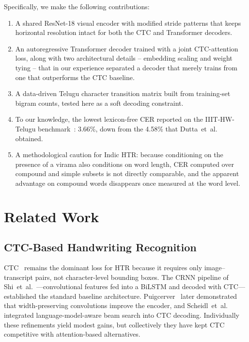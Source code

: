 \documentclass[conference]{IEEEtran}
\begin{document}
Specifically, we make the following contributions:

\begin{enumerate}
    \item A shared ResNet-18 visual encoder with modified stride patterns that keeps horizontal resolution intact for both the CTC and Transformer decoders.
    
    \item An autoregressive Transformer decoder trained with a joint CTC-attention loss, along with two architectural details -- embedding scaling and weight tying -- that in our experience separated a decoder that merely trains from one that outperforms the CTC baseline.
    
    \item A data-driven Telugu character transition matrix built from training-set bigram counts, tested here as a soft decoding constraint.
    
    \item To our knowledge, the lowest lexicon-free CER reported on the IIIT-HW-Telugu benchmark~\cite{gongidi2021iiit}: 3.66\%, down from the 4.58\% that Dutta~et~al.~\cite{dutta2018} obtained.

    \item A methodological caution for Indic HTR: because conditioning on the presence of a virama also conditions on word length, CER computed over compound and simple subsets is not directly comparable, and the apparent advantage on compound words disappears once measured at the word level.
\end{enumerate}

\section{Related Work}

\subsection{CTC-Based Handwriting Recognition}

CTC~\cite{graves2006ctc} remains the dominant loss for HTR because it requires only image--transcript pairs, not character-level bounding boxes. The CRNN pipeline of Shi~et~al.~\cite{shi2017crnn}---convolutional features fed into a BiLSTM and decoded with CTC---established the standard baseline architecture. Puigcerver~\cite{puigcerver2017} later demonstrated that width-preserving convolutions improve the encoder, and Scheidl~et~al.~\cite{scheidl2018word} integrated language-model-aware beam search into CTC decoding. Individually these refinements yield modest gains, but collectively they have kept CTC competitive with attention-based alternatives.
\end{document}

